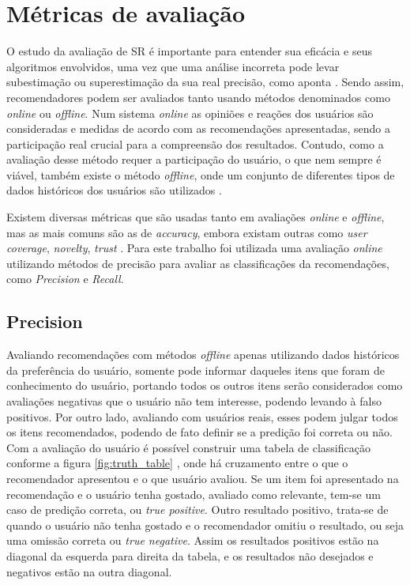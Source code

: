 \section{Métricas de avaliação}

O estudo da avaliação de \ac{SR} é importante para entender sua eficácia e seus algoritmos envolvidos, uma vez que uma análise incorreta pode levar subestimação ou superestimação da sua real precisão, como aponta \cite{Aggarwal2016:Evaluation}. Sendo assim, recomendadores podem ser avaliados tanto usando métodos denominados como \textit{online} ou \textit{offline}. Num sistema \textit{online} as opiniões e reações dos usuários são consideradas e medidas de acordo com as recomendações apresentadas, sendo a participação real crucial para a compreensão dos resultados. Contudo, como a avaliação desse método requer a participação do usuário, o que nem sempre é viável, também existe o método \textit{offline}, onde um conjunto de diferentes tipos de dados históricos dos usuários são utilizados \citep{Herlocker:1999}.

Existem diversas métricas que são usadas tanto em avaliações \textit{online} e \textit{offline}, mas as mais comuns são as de \textit{accuracy}, embora existam outras como \textit{user coverage}, \textit{novelty}, \textit{trust} \citep{Jannach:2010}. Para este trabalho foi utilizada uma avaliação \textit{online} utilizando métodos de precisão para avaliar as classificações da recomendações, como \textit{Precision} e \textit{Recall}.

\subsection{Precision}

Avaliando recomendações com métodos \textit{offline} apenas utilizando dados históricos da preferência do usuário, somente pode informar daqueles itens que foram de conhecimento do usuário, portando todos os outros itens serão considerados como avaliações negativas que o usuário não tem interesse, podendo levando à falso positivos. Por outro lado, avaliando com usuários reais, esses podem julgar todos os itens recomendados, podendo de fato definir se a predição foi correta ou não. Com a avaliação do usuário é possível construir uma tabela de classificação conforme a figura \ref{fig:truth_table} \citep{Jannach:2010}, onde há cruzamento entre o que o recomendador apresentou e o que usuário avaliou. Se um item foi apresentado na recomendação e o usuário tenha gostado, avaliado como relevante, tem-se um caso de predição correta, ou \textit{true positive}. Outro resultado positivo, trata-se de quando o usuário não tenha gostado e o recomendador omitiu o resultado, ou seja uma omissão correta ou \textit{true negative}. Assim os resultados positivos estão na diagonal da esquerda para direita da tabela, e os resultados não desejados e negativos estão na outra diagonal. 

